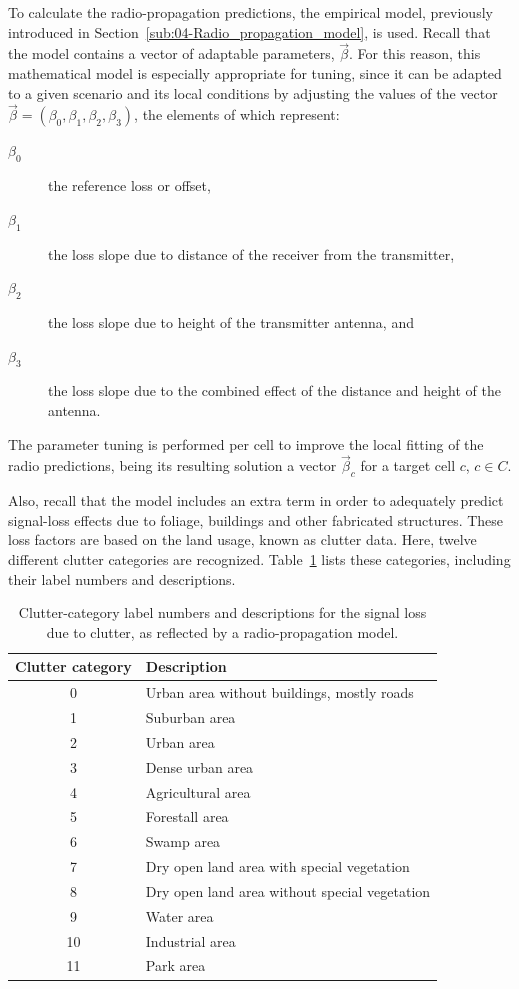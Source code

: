 To calculate the radio-propagation predictions, the empirical model,
previously introduced in Section~\ref{sub:04-Radio_propagation_model},
is used. Recall that the model contains a vector of adaptable parameters,
$\vec{\beta}$. For this reason, this mathematical model is especially
appropriate for tuning, since it can be adapted to a given scenario
and its local conditions by adjusting the values of the vector $\vec{\beta}=(\beta_{0},\beta_{1},\beta_{2},\beta_{3})$,
the elements of which represent:
\begin{description}
\item [{$\beta_{0}$}] the reference loss or offset,
\item [{$\beta_{1}$}] the loss slope due to distance of the receiver from
the transmitter,
\item [{$\beta_{2}$}] the loss slope due to height of the transmitter
antenna, and
\item [{$\beta_{3}$}] the loss slope due to the combined effect of the
distance and height of the antenna.
\end{description}
The parameter tuning is performed per cell to improve the local fitting
of the radio predictions, being its resulting solution a vector $\vec{\beta}_{c}$
for a target cell $c$, $c\in C$.

Also, recall that the model includes an extra term in order to adequately
predict signal-loss effects due to foliage, buildings and other fabricated
structures. These loss factors are based on the land usage, known
as clutter data. Here, twelve different clutter categories are recognized.
Table~\ref{tab:05-Clutter_categories} lists these categories, including
their label numbers and descriptions. 

\begin{table}
\centering

\caption{Clutter-category label numbers and descriptions for the signal loss
due to clutter, as reflected by a radio-propagation model. \label{tab:05-Clutter_categories}}


\begin{tabular}{cl}
\hline 
Clutter category & Description\tabularnewline
\hline 
0 & Urban area without buildings, mostly roads\tabularnewline
1 & Suburban area \tabularnewline
2 & Urban area\tabularnewline
3 & Dense urban area\tabularnewline
4 & Agricultural area\tabularnewline
5 & Forestall area\tabularnewline
6 & Swamp area\tabularnewline
7 & Dry open land area with special vegetation\tabularnewline
8 & Dry open land area without special vegetation\tabularnewline
9 & Water area\tabularnewline
10 & Industrial area\tabularnewline
11  & Park area\tabularnewline
\hline 
\end{tabular}
\end{table}



